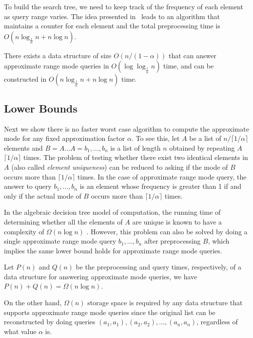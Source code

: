 \documentclass{llncs}
\begin{document}
To build the search tree, we need to keep track of the 
frequency of each element as query range varies. 
The idea presented in~\cite{dlm02} leads to an algorithm that
maintains a counter for each element and the total preprocessing time
is $O(n\log_{\frac{1}{\alpha}} n +n\log n)$.

\begin{theorem}\label{mode}
There exists a data structure of size $O(n/(1-\alpha))$ that can answer approximate 
range mode queries in $O(\log\log_{\frac{1}{\alpha}} n)$ time, and can be constructed 
in $O(n\log_{\frac{1}{\alpha}} n +n\log n)$ time.
\end{theorem}



\subsection{Lower Bounds}


Next we show there is no faster worst case algorithm to 
compute the approximate mode for any fixed approximation factor
$\alpha$. 
To see this, let $A$ be a list of $n/\lceil 1/\alpha \rceil$ 
elements and $B=A \ldots A=b_1, \ldots, b_n$ is a list of length $n$ 
obtained by repeating $A$ $\lceil 1/\alpha \rceil$ times. 
The problem of testing whether there exist two identical elements in $A$ 
(also called {\it element uniqueness}) can be reduced to asking if the mode 
of $B$ occurs more than $\lceil 1/\alpha \rceil$ times. In the case of 
approximate range mode query, the answer to query $b_1,\ldots, b_n$ is 
an element whose frequency is greater than 1 if and only if the actual 
mode of $B$ occurs more than $\lceil 1/\alpha \rceil$ times. 

In the algebraic decision tree model of computation, the running time of 
determining whether all the elements of $A$ are unique is known to have 
a complexity of $\Omega(n \log n)$ \cite{o83}. However, 
this problem can also be 
solved by doing a single approximate range mode query $b_1,\ldots, b_n$ 
after preprocessing $B$, which implies the same lower bound holds for 
approximate range mode queries.

\begin{theorem}
Let $P(n)$ and $Q(n)$ be the preprocessing and query times, respectively, 
of a data structure for answering approximate mode queries, we have 
$P(n) + Q(n) = \Omega(n\log n)$.
\end{theorem}

On the other hand, $\Omega(n)$ storage space is required by any data structure
that supports approximate range mode queries since the original list can be 
reconstructed by doing queries $(a_1,a_1),(a_2,a_2),\ldots,(a_n,a_n)$, 
regardless of what value $\alpha$ is.
\end{document}
